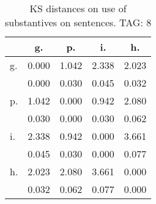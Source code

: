 \begin{table}[h!]
\begin{center}
\begin{tabular}{| l | c | c | c | c |}\hline
 & g. & p. & i. & h. \\\hline
g. & 0.000  & 1.042  & 2.338  & 2.023 \\\hline
 & 0.000  & 0.030  & 0.045  & 0.032 \\\hline
p. & 1.042  & 0.000  & 0.942  & 2.080 \\\hline
 & 0.030  & 0.000  & 0.030  & 0.062 \\\hline
i. & 2.338  & 0.942  & 0.000  & 3.661 \\\hline
 & 0.045  & 0.030  & 0.000  & 0.077 \\\hline
h. & 2.023  & 2.080  & 3.661  & 0.000 \\\hline
 & 0.032  & 0.062  & 0.077  & 0.000 \\\hline
\end{tabular}
\caption{KS distances on use of substantives on sentences. TAG: 8}
\end{center}
\end{table}